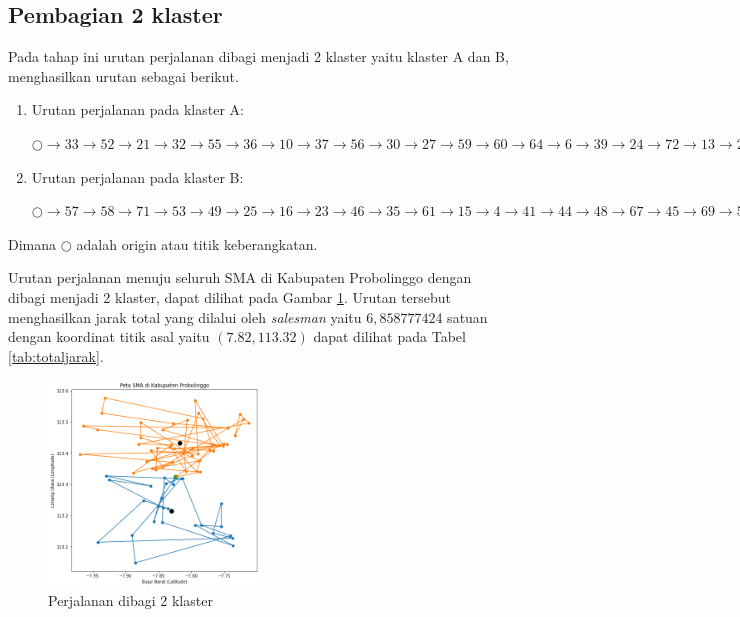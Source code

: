 \subsection{Pembagian 2 klaster}

Pada tahap ini urutan perjalanan dibagi menjadi 2 klaster yaitu klaster A dan B, menghasilkan urutan sebagai berikut.

\begin{enumerate}
\item Urutan perjalanan pada klaster A:

$\bigcirc \to 33 \to 52 \to 21 \to 32 \to 55 \to 36 \to 10 \to 37 \to 56 \to 30 \to 27 \to 59 \to 60 \to 64 \to 6 \to 39 \to 24 \to 72 \to 13 \to 29 \to 11 \to 63 \to 9 \to 17 \to 47 \to 38 \to \bigcirc$

\item Urutan perjalanan pada klaster B:

$\bigcirc \to 57 \to 58 \to 71 \to 53 \to 49 \to 25 \to 16 \to 23 \to 46 \to 35 \to 61 \to 15 \to 4 \to 41 \to 44 \to 48 \to 67 \to 45 \to 69 \to 5 \to 8 \to 42 \to 50 \to 22 \to 51 \to 74 \to 26 \to 19 \to 34 \to 43 \to 65 \to 12 \to 28 \to 14 \to 70 \to 66 \to 3 \to 40 \to 20 \to 62 \to 31 \to 18 \to 7 \to 54 \to 68 \to 73 \to 75 \to 2 \to 1 \to \bigcirc$

\end{enumerate}

\noindent Dimana $\bigcirc$ adalah origin atau titik keberangkatan.

Urutan perjalanan menuju seluruh SMA di Kabupaten Probolinggo dengan dibagi menjadi 2 klaster, dapat dilihat pada Gambar \ref{fig:hasil_mtsp2}. Urutan tersebut menghasilkan jarak total yang dilalui oleh \textit{salesman} yaitu $6,858777424$ satuan dengan koordinat titik asal yaitu $(7.82, 113.32)$ dapat dilihat pada Tabel \ref{tab:totaljarak}.


\begin{figure}[H]
\centering
\includegraphics[width=0.5\textwidth]{Gambar/hasil_mtsp/2}
\caption{Perjalanan dibagi 2 klaster}
\label{fig:hasil_mtsp2}
\end{figure}


